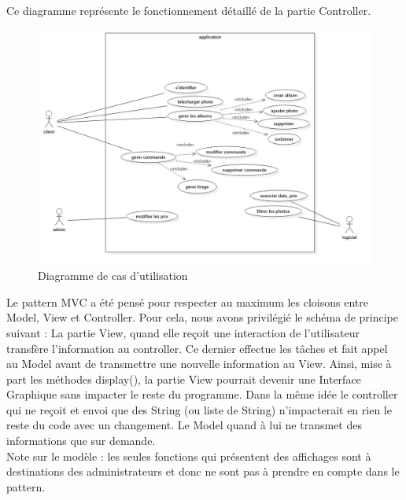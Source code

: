 \documentclass{article}
\begin{document}
\begin{flushleft}
Ce diagramme représente le fonctionnement détaillé de la partie Controller.\\
\vspace{1\baselineskip}
\begin{figure}[!h]
  \begin{center}
    \includegraphics[scale=0.25]{fig7} %
    \caption{Diagramme de cas d'utilisation}
  \end{center}
\end{figure}
Le pattern MVC a été pensé pour respecter au maximum les cloisons entre Model,
View et Controller. Pour cela, nous avons privilégié le schéma de principe
suivant : La partie View, quand elle reçoit une interaction de l’utilisateur
transfère l’information au controller. Ce dernier effectue les tâches et fait
appel au Model avant de transmettre une nouvelle information au View.
Ainsi, mise à part les méthodes display(), la partie View pourrait devenir une
Interface Graphique sans impacter le reste du programme. Dans la même idée le
controller qui ne reçoit et envoi que des String (ou liste de String)
n’impacterait en rien le reste du code avec un changement. Le Model quand
à lui ne transmet des informations que sur demande.\\
\vspace{1\baselineskip}
Note sur le modèle : les seules fonctions qui présentent des affichages
sont à destinations des administrateurs et donc ne sont pas à prendre en
compte dans le pattern.
\vspace{1\baselineskip}
\vspace{1\baselineskip}
\begin{figure}[!h]

\end{figure}
\end{flushleft}
\end{document}
